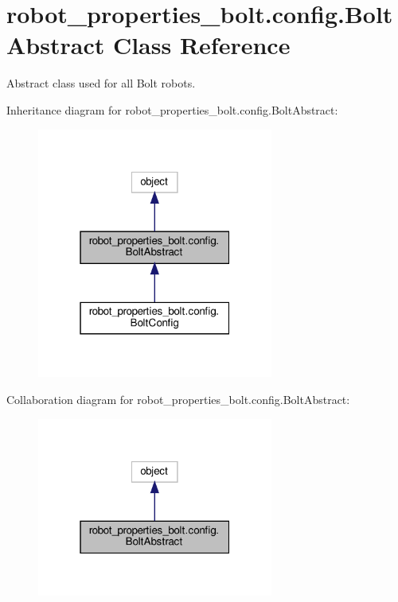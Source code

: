 \hypertarget{classrobot__properties__bolt_1_1config_1_1BoltAbstract}{}\section{robot\+\_\+properties\+\_\+bolt.\+config.\+Bolt\+Abstract Class Reference}
\label{classrobot__properties__bolt_1_1config_1_1BoltAbstract}


Abstract class used for all Bolt robots.  




Inheritance diagram for robot\+\_\+properties\+\_\+bolt.\+config.\+Bolt\+Abstract\+:
\nopagebreak
\begin{figure}[H]
\begin{center}
\leavevmode
\includegraphics[width=220pt]{classrobot__properties__bolt_1_1config_1_1BoltAbstract__inherit__graph}
\end{center}
\end{figure}


Collaboration diagram for robot\+\_\+properties\+\_\+bolt.\+config.\+Bolt\+Abstract\+:
\nopagebreak
\begin{figure}[H]
\begin{center}
\leavevmode
\includegraphics[width=220pt]{classrobot__properties__bolt_1_1config_1_1BoltAbstract__coll__graph}
\end{center}
\end{figure}
